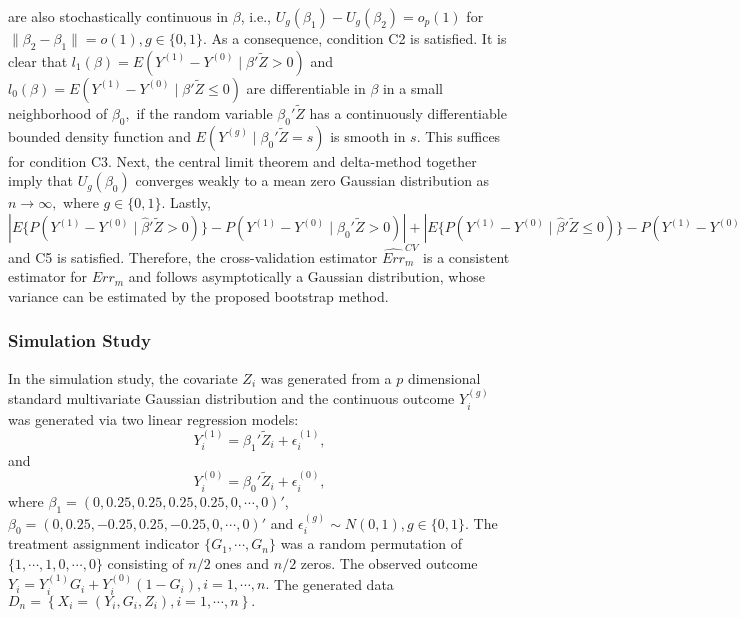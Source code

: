 \documentclass[12pt]{article}
\begin{document}
are also stochastically continuous in $\beta$, i.e., $U_g(\beta_1)-U_g(\beta_2)=o_p(1)$ for $\|\beta_2-\beta_1\|=o(1), g\in \{0, 1\}.$ As a consequence, condition C2 is satisfied.
It is clear that $l_1(\beta)=E\left(Y^{(1)}-Y^{(0)} \mid \beta'\tilde{Z}>0 \right)$ and $l_0(\beta)=E\left(Y^{(1)}-Y^{(0)} \mid \beta' \tilde{Z}\le 0 \right)$ are differentiable in $\beta$ in a small neighborhood of $\beta_0,$ if the random variable $\beta_0'\tilde{Z}$ has a continuously differentiable bounded density function and $E\left(Y^{(g)}\mid \beta_0'\tilde{Z}=s\right)$ is smooth in $s$.  This suffices for condition C3.  Next, the central limit theorem and delta-method together imply that $U_g(\beta_0)$
converges weakly to a mean zero Gaussian distribution as $n \rightarrow \infty,$ where $g\in \{0, 1\}.$  Lastly, $|E\{P(Y^{(1)}-Y^{(0)}\mid \hat{\beta}'\tilde{Z}>0)\}-P(Y^{(1)}-Y^{(0)}\mid \beta_0'\tilde{Z}>0)|+|E\{P(Y^{(1)}-Y^{(0)}\mid \hat{\beta}'\tilde{Z}\le 0)\}-P(Y^{(1)}-Y^{(0)}\mid \beta_0'\tilde{Z}\le 0)|=o_p(|E(\hat{\beta})-\beta_0|)=o_p(n^{-1/2}),$ and C5 is satisfied. Therefore, the cross-validation estimator $\widehat{Err}^{CV}_m$ is a consistent estimator for $Err_m$ and follows asymptotically a Gaussian distribution, whose variance can be estimated by the proposed bootstrap method.

\subsubsection{Simulation Study}
In the simulation study, the covariate $Z_i$ was generated from a $p$ dimensional standard multivariate Gaussian distribution and the continuous outcome $Y_i^{(g)} $ was generated via two linear regression models:
$$ Y_i^{(1)}=\beta_1'\tilde{Z}_i+\epsilon_i^{(1)},$$
and
$$ Y_i^{(0)}=\beta_0'\tilde{Z}_i+\epsilon_i^{(0)},$$
where $\beta_1=(0, 0.25, 0.25, 0.25, 0.25, 0, \cdots, 0)'$, $\beta_0=(0, 0.25, -0.25, 0.25, -0.25, 0, \cdots, 0)'$ and $\epsilon_i^{(g)}\sim N(0, 1), g\in \{0, 1\}.$ The treatment assignment indicator $\{G_1, \cdots, G_n\}$ was a random permutation of $\{1, \cdots, 1, 0, \cdots, 0\}$ consisting of $n/2$ ones and $n/2$ zeros. The observed outcome $Y_i=Y_i^{(1)}G_i+Y_i^{(0)}(1-G_i), i=1, \cdots, n.$  The generated data  $D_n=\left\{X_i=(Y_i, G_i, Z_i), i=1, \cdots, n\right\}.$
\end{document}
